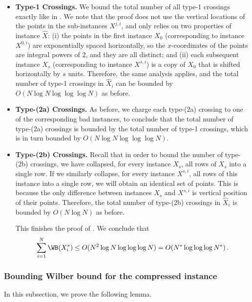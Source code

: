 \begin{itemize}
    \item {\bf Type-1 Crossings.}
We bound the total number of all type-1 crossings exactly like in . We note that the proof does not use the vertical locations of the points in the sub-instances $X^{j,i}$, and only relies on two properties of instance $\hat X$: (i) the points in the first instance $X_0$ (corresponding to instance $X^{0,i}$) are exponentially spaced horizontally, so the $x$-coordinates of the points are integral powers of $2$, and they are all distinct; and (ii) each subsequent instance $X_s$ (corresponding to instance $X^{s,i}$) is a copy of $X_0$ that is shifted horizontally by $s$ units. Therefore, the same analysis applies, and the total number of type-1 crossings in $\hat X_i$ can be bounded by $O(N\log N\log\log\log N)$ as before.

\item {\bf Type-(2a) Crossings.}
As before, we charge each type-(2a) crossing to one of the corresponding bad instances, to conclude that the total number of type-(2a) crossings is bounded by the total number of type-1 crossings, which is in turn bounded by $O(N\log N\log\log\log N)$.

\item  {\bf Type-(2b) Crossings.}
Recall that in order to bound the number of type-(2b) crossings, we have collapsed, for every instance $X_s$, all rows of $X_s$ into a single row. If we similarly collapse, for every instance $X^{s,i}$, all rows of this instance into a single row, we will obtain an identical set of points. This is because the only difference between instances $X_s$ and $X^{s,i}$ is vertical position of their points. Therefore, the total number of type-(2b) crossings in $\hat X_i$ is bounded by $O(N\log N)$ as before.

This finishes the proof of . We conclude that %
\begin{equation}
  \sum_{i=1}^N\WB(X_i^*)\leq O(N^2\log N\log\log\log N)=O(N^*\log\log\log N^*)\,.
\end{equation}
\end{itemize}







\subsubsection{Bounding Wilber bound for the compressed instance}
In this subsection, we prove the following lemma.


